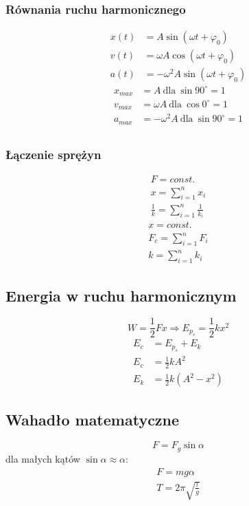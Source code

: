 \documentclass{article}
\numberwithin{equation}{section}
\begin{document}
      \subsubsection{Równania ruchu harmonicznego}
        \begin{align}
          x(t) &= A\sin(\omega t + \varphi_0)\\
          v(t) &= \omega A\cos(\omega t + \varphi_0)\\
          a(t) &= -\omega^2A\sin(\omega t + \varphi_0)
        \end{align}
        \begin{align}
          x_{max} &= A\ \text{dla}\ \sin90^\circ = 1\\
          v_{max} &= \omega A\ \text{dla}\ \cos0^\circ = 1\\
          a_{max} &= -\omega^2A\ \text{dla}\ \sin90^\circ = 1\\
        \end{align}
      \subsubsection{Łączenie sprężyn}
        \begin{gather}
          F = const.\\
          x = \sum_{i=1}^n x_i\\
          \frac{1}{k} = \sum_{i=1}^n \frac{1}{k_i}
        \end{gather}
        \begin{gather}
          x = const.\\
          F_c = \sum_{i=1}^n F_i\\
          k = \sum_{i=1}^n k_i
        \end{gather}
    \subsection{Energia w ruchu harmonicznym}
      \begin{equation}
        W = \frac{1}{2}Fx \Rightarrow E_{p_s} = \frac{1}{2}kx^2
      \end{equation}
      \begin{align}
        E_c &= E_{p_s} + E_k\\
        E_c &= \frac{1}{2}kA^2\\
        E_k &= \frac{1}{2}k(A^2 - x^2)
      \end{align}
    \subsection{Wahadło matematyczne}
      \begin{equation}
        F = F_g\sin\alpha
      \end{equation}
      dla małych kątów $\sin\alpha\approx\alpha$:
      \begin{gather}
        F = mg\alpha\\
        T = 2\pi\sqrt{\frac lg}
      \end{gather}
\end{document}
